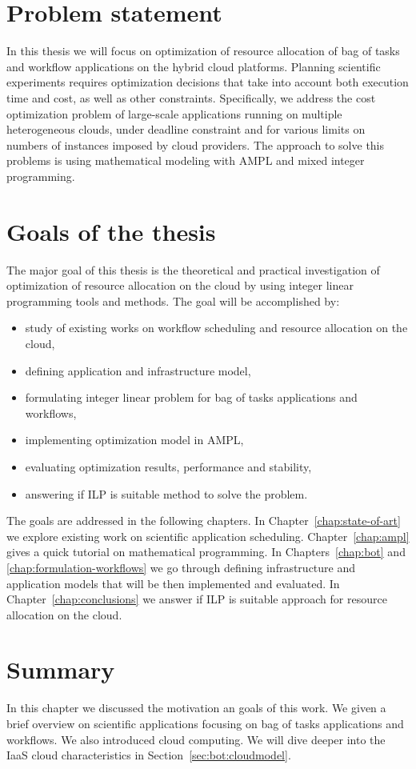 \section{Problem statement}
\label{intro:statement}

In this thesis we will focus on optimization of resource allocation of bag of tasks and workflow applications on the hybrid cloud platforms. Planning scientific experiments requires optimization decisions that take into account both execution time and cost, as well as other constraints. Specifically, we address the cost optimization problem of large-scale applications running on multiple heterogeneous clouds, under deadline constraint and for various limits on numbers of instances imposed by cloud providers. The approach to solve this problems is using mathematical modeling with AMPL and mixed integer programming.


\section{Goals of the thesis}
\label{intro:goals}

The major goal of this thesis is the theoretical and practical investigation of optimization of resource allocation on the cloud by using integer linear programming tools and methods. The goal will be accomplished by:

\begin{itemize}
  \item study of existing works on workflow scheduling and resource allocation on the cloud,
  \item defining application and infrastructure model,
  \item formulating integer linear problem for bag of tasks applications and workflows,
  \item implementing optimization model in AMPL,
  \item evaluating optimization results, performance and stability,
  \item answering if ILP is suitable method to solve the problem.
\end{itemize}

The goals are addressed in the following chapters. In Chapter~\ref{chap:state-of-art} we explore existing work on scientific application scheduling. Chapter~\ref{chap:ampl} gives a quick tutorial on mathematical programming. In Chapters~\ref{chap:bot} and \ref{chap:formulation-workflows} we go through defining infrastructure and application models that will be then implemented and evaluated. In Chapter~\ref{chap:conclusions} we answer if ILP is suitable approach for resource allocation on the cloud.
 
\section{Summary}

In this chapter we discussed the motivation an goals of this work. We given a brief overview on scientific applications focusing on bag of tasks applications and workflows. We also introduced cloud computing. We will dive deeper into the IaaS cloud characteristics in Section~\ref{sec:bot:cloudmodel}.

